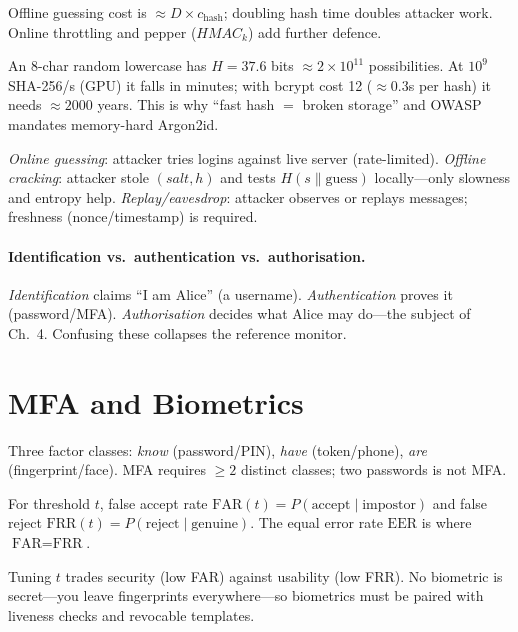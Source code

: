 Offline guessing cost is $\approx D \times c_{\text{hash}}$; doubling hash time doubles attacker work. Online throttling and pepper ($HMAC_{k}$) add further defence.

\begin{example}
An 8-char random lowercase has $H=37.6$ bits $\approx 2\times10^{11}$ possibilities. At $10^9$ SHA-256/s (GPU) it falls in minutes; with bcrypt cost 12 ($\approx 0.3$s per hash) it needs $\approx 2000$ years. This is why ``fast hash $=$ broken storage'' and OWASP mandates memory-hard Argon2id.
\end{example}

\begin{definition}
\emph{Online guessing}: attacker tries logins against live server (rate-limited). \emph{Offline cracking}: attacker stole $(salt,h)$ and tests $H(s\parallel\text{guess})$ locally---only slowness and entropy help. \emph{Replay/eavesdrop}: attacker observes or replays messages; freshness (nonce/timestamp) is required.
\end{definition}

\paragraph{Identification vs.\ authentication vs.\ authorisation.} \emph{Identification} claims ``I am Alice'' (a username). \emph{Authentication} proves it (password/MFA). \emph{Authorisation} decides what Alice may do---the subject of Ch.~4. Confusing these collapses the reference monitor.

\section{MFA and Biometrics}
\label{sec:mfa-bio}
Three factor classes: \emph{know} (password/PIN), \emph{have} (token/phone), \emph{are} (fingerprint/face). MFA requires $\ge 2$ distinct classes; two passwords is not MFA.

\begin{definition}
For threshold $t$, false accept rate $\text{FAR}(t)=P(\text{accept}\mid\text{impostor})$ and false reject $\text{FRR}(t)=P(\text{reject}\mid\text{genuine})$. The equal error rate $\text{EER}$ is where $\text{FAR}=\text{FRR}$.
\end{definition}
Tuning $t$ trades security (low FAR) against usability (low FRR). No biometric is secret---you leave fingerprints everywhere---so biometrics must be paired with liveness checks and revocable templates.

